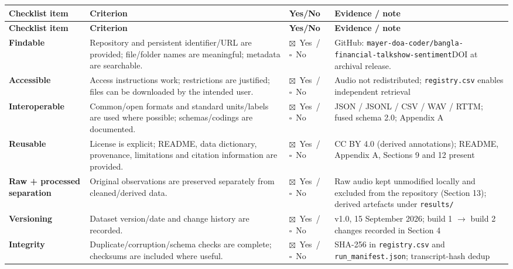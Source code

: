 \documentclass[11pt,a4paper]{article}
\newcommand{\thd}[1]{\textbf{\sffamily\small #1}}          %
\begin{document}
\begingroup\footnotesize
\begin{longtable}{|L{2.9cm}|L{6.4cm}|L{2.3cm}|L{3.4cm}|}
\hline
\thd{Checklist item} & \thd{Criterion} & \thd{Yes/No} & \thd{Evidence / note} \\ \hline
\endfirsthead
\hline \thd{Checklist item} & \thd{Criterion} & \thd{Yes/No} & \thd{Evidence / note} \\ \hline \endhead
\thd{Findable}       & Repository and persistent identifier/URL are provided; file/folder names are meaningful; metadata are searchable. & $\boxtimes$~Yes~/~$\square$~No & GitHub: \texttt{mayer-}\newline\texttt{doa-coder/}\newline\texttt{bangla-financial-}\newline\texttt{talkshow-}\newline\texttt{sentiment}\newline{}DOI at archival release. \\ \hline
\thd{Accessible}     & Access instructions work; restrictions are justified; files can be downloaded by the intended user. & $\boxtimes$~Yes~/~$\square$~No & Audio not redistributed; \texttt{registry.csv} enables independent retrieval \\ \hline
\thd{Interoperable}  & Common/open formats and standard units/labels are used where possible; schemas/codings are documented. & $\boxtimes$~Yes~/~$\square$~No & JSON / JSONL / CSV / WAV / RTTM; fused schema 2.0; Appendix A \\ \hline
\thd{Reusable}       & License is explicit; README, data dictionary, provenance, limitations and citation information are provided. & $\boxtimes$~Yes~/~$\square$~No & CC BY 4.0 (derived annotations); README, Appendix A, Sections 9 and 12 present \\ \hline
\thd{Raw + processed separation} & Original observations are preserved separately from cleaned/derived data. & $\boxtimes$~Yes~/~$\square$~No & Raw audio kept unmodified locally and excluded from the repository (Section 13); derived artefacts under \texttt{results/} \\ \hline
\thd{Versioning}     & Dataset version/date and change history are recorded. & $\boxtimes$~Yes~/~$\square$~No & v1.0, 15 September 2026; build 1 $\rightarrow$ build 2 changes recorded in Section 4 \\ \hline
\thd{Integrity}      & Duplicate/corruption/schema checks are complete; checksums are included where useful. & $\boxtimes$~Yes~/~$\square$~No & SHA-256 in \texttt{registry.csv} and \texttt{run\_manifest.json}; transcript-hash dedup \\ \hline

\end{longtable}
\end{document}
